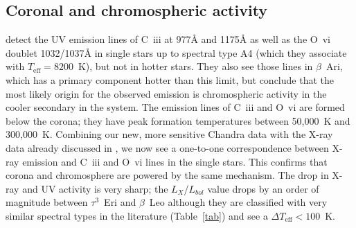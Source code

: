 \documentclass[preprint2]{aastex631}
\begin{document}


\subsection{Coronal and chromospheric activity}
\cite{2002ApJ...579..800S} detect the UV emission lines
of C~{\sc iii} at 977\AA{} and 1175\AA{} as well as the O~{\sc vi}
doublet 1032/1037\AA{} in single stars up to spectral type A4 (which
they associate with $T_\mathrm{eff}=8200$~K), but not in hotter stars. They also see those
lines in $\beta$~Ari, which has a primary component hotter than this
limit, but conclude that the most likely origin for the observed
emission is chromospheric activity in the cooler secondary in the
system. The emission lines of C~{\sc iii} and O~{\sc vi} are formed
below the corona; they have peak formation temperatures between
50,000~K and 300,000~K. Combining our new, more sensitive Chandra data with the X-ray data already discussed in \cite{2002ApJ...579..800S}, 
we now see a one-to-one correspondence between X-ray emission and
C~{\sc iii} and O~{\sc vi} lines in the single stars. This confirms that corona and chromosphere are powered by the same mechanism.
The drop in X-ray and UV activity is very sharp; the $L_X$/$L_{bol}$ value drops by
an order of magnitude between $\tau^3$~Eri and
$\beta$~Leo although they are classified with very similar spectral types in the literature (Table~\ref{tab}) and \citet{2002ApJ...579..800S} see a $\Delta T_\mathrm{eff} < 100$~K.
\end{document}
